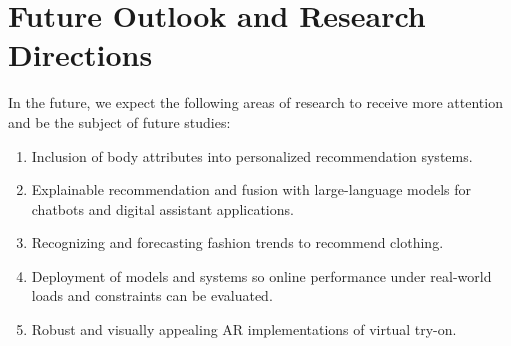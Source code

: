 \section{\textbf{Future Outlook and Research Directions}} \label{section:future}
	In the future, we expect the following areas of research to receive more attention and be the subject of future studies:

	\begin{enumerate}
		\item Inclusion of body attributes into personalized recommendation systems.
		\item Explainable recommendation and fusion with large-language models for chatbots and digital assistant applications.
		\item Recognizing and forecasting fashion trends to recommend clothing.
		\item Deployment of models and systems so online performance under real-world loads and constraints can be evaluated.
		\item Robust and visually appealing AR implementations of virtual try-on.
	\end{enumerate}
